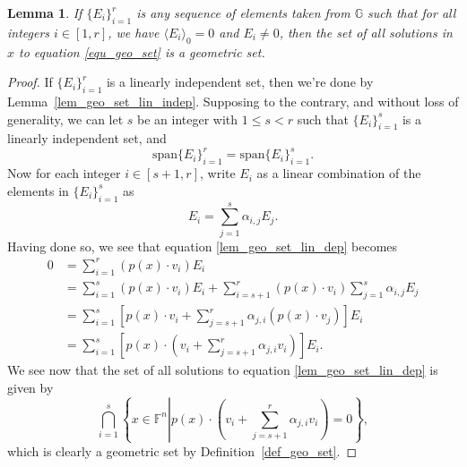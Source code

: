 \documentclass{birkjour}
\newtheorem{lem}[thm]{Lemma}
\theoremstyle{definition}
\theoremstyle{remark}
\numberwithin{equation}{section}
\newcommand{\F}{\mathbb{F}}
\newcommand{\G}{\mathbb{G}}
\begin{document}
\begin{lem}\label{lem_geo_set_lin_dep}
If $\{E_i\}_{i=1}^r$ is any sequence of elements taken from $\G$ such that for all integers $i\in[1,r]$, we have
$\langle E_i\rangle_0=0$ and $E_i\neq 0$, then the set of all solutions in $x$ to equation \eqref{equ_geo_set}
is a geometric set.
\end{lem}
\begin{proof}
If $\{E_i\}_{i=1}^r$ is a linearly independent set, then we're done by Lemma~\ref{lem_geo_set_lin_indep}.
Supposing to the contrary, and without loss of generality, we can let $s$ be an integer with $1\leq s<r$ such that
$\{E_i\}_{i=1}^s$ is a linearly independent set, and
\begin{equation*}
\mbox{span}\{E_i\}_{i=1}^r = \mbox{span}\{E_i\}_{i=1}^s.
\end{equation*}
Now for each integer $i\in[s+1,r]$, write $E_i$ as a linear combination of the elements in $\{E_i\}_{i=1}^s$ as
\begin{equation*}
E_i = \sum_{j=1}^s\alpha_{i,j} E_j.
\end{equation*}
Having done so, we see that equation \eqref{lem_geo_set_lin_dep} becomes
\begin{align*}
0 &= \sum_{i=1}^r(p(x)\cdot v_i)E_i \\
 &= \sum_{i=1}^s(p(x)\cdot v_i)E_i + \sum_{i=s+1}^r(p(x)\cdot v_i)\sum_{j=1}^s\alpha_{i,j}E_j \\
 &= \sum_{i=1}^s\left[p(x)\cdot v_i+\sum_{j=s+1}^r\alpha_{j,i}(p(x)\cdot v_j)\right]E_i \\
 &= \sum_{i=1}^s\left[p(x)\cdot\left(v_i+\sum_{j=s+1}^r\alpha_{j,i}v_i\right)\right]E_i.
\end{align*}
We see now that the set of all solutions to equation \eqref{lem_geo_set_lin_dep} is given by
\begin{equation*}
\bigcap_{i=1}^s\left\{x\in\F^n\left|p(x)\cdot\left(v_i+\sum_{j=s+1}^r\alpha_{j,i}v_i\right)=0\right.\right\},
\end{equation*}
which is clearly a geometric set by Definition~\ref{def_geo_set}.
\end{proof}
\end{document}
